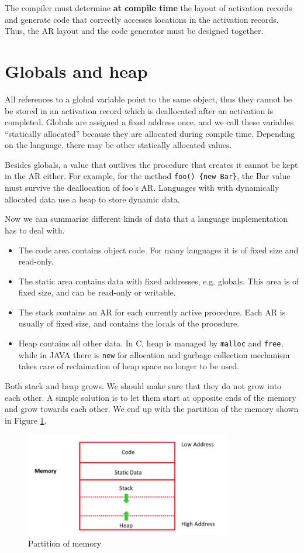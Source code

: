 The compiler must determine \textbf{at compile time} the layout of activation records and generate code that correctly accesses locations in the activation records. Thus, the AR layout and the code generator must be designed together.
\section{Globals and heap}
All references to a global variable point to the same object, thus they cannot be be stored in an activation record which is deallocated after an activation is completed. Globals are assigned a fixed address once, and we call these variables ``statically allocated'' because they are allocated during compile time. Depending on the language, there may be other statically allocated values.

Besides globals, a value that outlives the procedure that creates it cannot be kept in the AR either. For example, for the method \texttt{foo() \{new Bar\}}, the Bar value must survive the deallocation of foo's AR. Languages with with dynamically allocated data use a heap to store dynamic data. 

Now we can summarize different kinds of data that a language implementation has to deal with. 
\begin{itemize}
\item The code area contains object code. For many languages it is of fixed size and read-only.
\item The static area contains data with fixed addresses, e.g. globals. This area is of fixed size, and can be read-only or writable.
\item The stack contains an AR for each currently active procedure. Each AR is usually of fixed size, and contains the locals of the procedure.
\item Heap contains all other data. In C, heap is managed by \texttt{malloc} and \texttt{free}, while in JAVA there is \texttt{new} for allocation and garbage collection mechanism takes care of reclaimation of heap space no longer to be used.
\end{itemize}
Both stack and heap grows. We should make sure that they do not grow into each other. A simple solution is to let them start at opposite ends of the memory and grow towards each other. We end up with the partition of the memory shown in Figure \ref{mempart}. 
\begin{figure}[ht]
\centering
\includegraphics[width = 0.8\textwidth]{memory.jpg}
\caption{Partition of memory}\label{mempart}
\end{figure}
